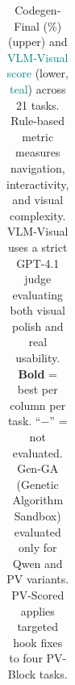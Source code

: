 \begin{table}[t]
{\begin{tabular}{@{}lcccccccccc@{}}
  \bottomrule\bottomrule
  \end{tabular}%
  }
  \caption{%
    Codegen-Final (\%) (upper) and \textcolor{teal}{\scriptsize VLM-Visual score} (lower, \textcolor{teal}{teal}) across 21 tasks.
    Rule-based metric measures navigation, interactivity, and visual complexity.
    VLM-Visual uses a strict GPT-4.1 judge evaluating both visual polish and real usability.
    \textbf{Bold} = best per column per task. ``$-$'' = not evaluated.
    Gen-GA (Genetic Algorithm Sandbox) evaluated only for Qwen and PV variants.
    PV-Scored applies targeted hook fixes to four PV-Block tasks.
  }
  \label{tab:main_results_v2}
\end{table}